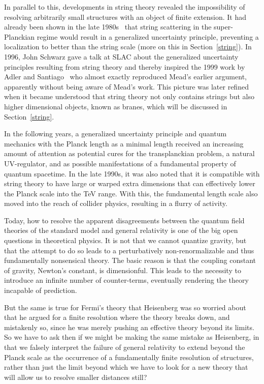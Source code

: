 \documentclass{article}
\begin{document}
In parallel to this, developments in string theory revealed the impossibility of resolving arbitrarily
small structures with an object of finite extension. It had already been shown in the late 1980s~\cite{Gross:1987ar,Amati:1987uf,Amati:1987wq,Amati:1990xe,Veneziano:1989fc}
that string scattering in the super-Planckian regime would result in a generalized uncertainty principle,
preventing a localization to better than the string scale (more on this in Section~\ref{string}). In 1996, John Schwarz gave a 
talk at {\sc SLAC} about the generalized uncertainty principles resulting from string theory and thereby inspired the 1999
work by Adler and Santiago~\cite{Adler} who almost exactly reproduced Mead's earlier argument, apparently
without being aware of Mead's work. This picture was later refined when it became understood that string theory
not only contains strings but also higher dimensional objects, known as branes, which will be discussed
in Section~\ref{string}.

In the following years, a generalized uncertainty principle and
quantum mechanics with the Planck length as a minimal length received an increasing amount of attention
as potential cures for the transplanckian problem, a natural UV-regulator, and as possible manifestations of a fundamental
property of quantum spacetime. In the late 1990s, it was also noted that it is compatible with string
theory to have large or warped extra dimensions that can effectively lower the Planck scale into the
TeV range. With this, the fundamental length scale also moved into the reach of collider physics,
resulting in a flurry of activity.%

Today, how to resolve the
apparent disagreements between the quantum field theories of the standard model and general relativity is one of the big open questions in theoretical physics. 
It is not that we cannot quantize gravity, but that the attempt to do so
leads to a perturbatively non-renormalizable and thus fundamentally nonsensical theory. The basic reason is
 that the coupling constant of gravity, Newton's constant, is dimensionful.
This leads to the necessity to introduce an infinite number of counter-terms, eventually
rendering the theory incapable of prediction.

But the same is true for Fermi's theory that Heisenberg was so worried about that
he argued for a finite resolution where the theory breaks down, and mistakenly so, 
since he was merely pushing an effective theory beyond its limits. 
So we have to ask then if we might be making the same mistake as Heisenberg, 
in that we falsely interpret the failure of general relativity to extend beyond the Planck scale
as the occurrence of a fundamentally finite resolution of structures, rather than just
the limit beyond which we have to look for a new theory that will allow us to resolve
smaller distances still? 
\end{document}
